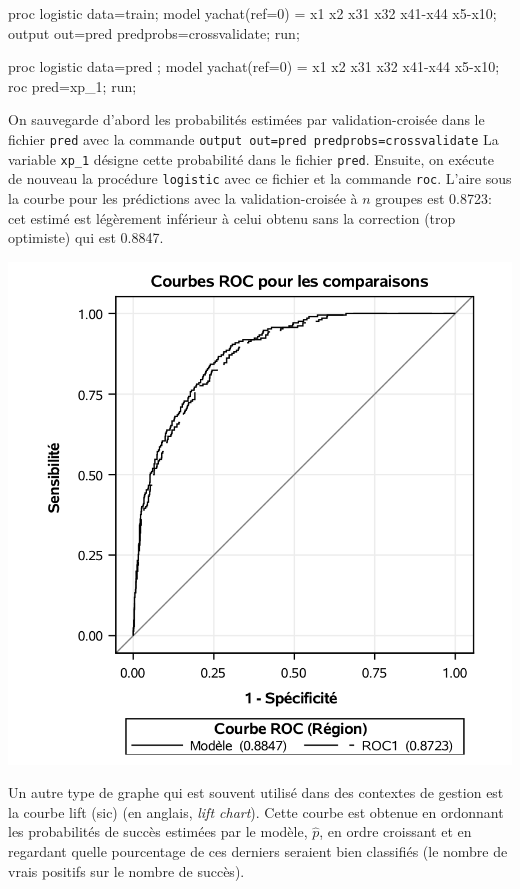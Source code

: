\documentclass[
  11pt,
  letterpaper,
]{book}
\newenvironment{Shaded}{\begin{snugshade}}{\end{snugshade}}
\newcommand{\NormalTok}[1]{#1}
\theoremstyle{definition}
\theoremstyle{definition}
\theoremstyle{definition}
\theoremstyle{definition}
\theoremstyle{remark}
\begin{document}
\begin{Shaded}
\begin{Highlighting}[]
\NormalTok{proc logistic data=train;}
\NormalTok{model yachat(ref=\textquotesingle{}0\textquotesingle{}) = x1 x2 x31 x32 x41{-}x44 x5{-}x10;}
\NormalTok{output out=pred predprobs=crossvalidate;}
\NormalTok{run;}

\NormalTok{proc logistic data=pred ;}
\NormalTok{model yachat(ref=\textquotesingle{}0\textquotesingle{}) = x1 x2 x31 x32 x41{-}x44 x5{-}x10;}
\NormalTok{roc pred=xp\_1;}
\NormalTok{run;}
\end{Highlighting}
\end{Shaded}

On sauvegarde d'abord les probabilités estimées par validation-croisée dans le
fichier \texttt{pred} avec la commande \texttt{output\ out=pred\ predprobs=crossvalidate}
La variable \texttt{xp\_1} désigne cette probabilité dans le fichier \texttt{pred}. Ensuite, on
exécute de nouveau la procédure \texttt{logistic} avec ce fichier et la commande \texttt{roc}.
L'aire sous la courbe pour les prédictions avec la validation-croisée à \(n\) groupes est 0.8723: cet estimé est légèrement inférieur à celui obtenu sans
la correction (trop optimiste) qui est 0.8847.

\begin{center}\includegraphics[width=0.8\linewidth]{figures/03-logistic-e15} \end{center}

Un autre type de graphe qui est souvent utilisé dans des contextes de gestion
est la courbe lift (sic) (en anglais, \emph{lift chart}). Cette courbe est obtenue en ordonnant les probabilités de succès estimées par le modèle, \(\widehat{p}\), en ordre croissant et en regardant quelle pourcentage de ces derniers seraient bien classifiés (le nombre de vrais positifs sur le nombre de succès).
\end{document}
